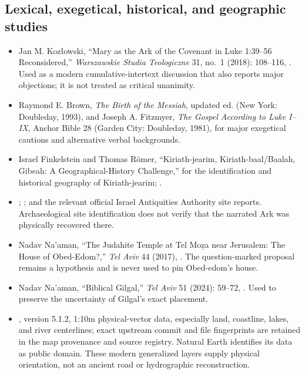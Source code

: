 \subsection{Lexical, exegetical, historical, and geographic studies}

\begin{itemize}
  \item Jan M. Kozłowski, ``Mary as the Ark of the Covenant in Luke 1:39--56 Reconsidered,'' \emph{Warszawskie Studia Teologiczne} 31, no.~1 (2018): 108--116, .  Used as a modern cumulative-intertext discussion that also reports major objections; it is not treated as critical unanimity.
  \item Raymond E. Brown, \emph{The Birth of the Messiah}, updated ed. (New York: Doubleday, 1993), and Joseph A. Fitzmyer, \emph{The Gospel According to Luke I--IX}, Anchor Bible 28 (Garden City: Doubleday, 1981), for major exegetical cautions and alternative verbal backgrounds.
  \item Israel Finkelstein and Thomas Römer, ``Kiriath-jearim, Kiriath-baal/Baalah, Gibeah: A Geographical-History Challenge,'' for the identification and historical geography of Kiriath-jearim; .
  \item {}; ; and the relevant official Israel Antiquities Authority site reports.  Archaeological site identification does not verify that the narrated Ark was physically recovered there.
  \item Nadav Na'aman, ``The Judahite Temple at Tel Mo\d{z}a near Jerusalem: The House of Obed-Edom?,'' \emph{Tel Aviv} 44 (2017), .  The question-marked proposal remains a hypothesis and is never used to pin Obed-edom's house.
  \item Nadav Na'aman, ``Biblical Gilgal,'' \emph{Tel Aviv} 51 (2024): 59--72, .  Used to preserve the uncertainty of Gilgal's exact placement.
  \item {}, version 5.1.2, 1:10m physical-vector data, especially land, coastline, lakes, and river centerlines; exact upstream commit and file fingerprints are retained in the map provenance and source registry.  Natural Earth identifies its data as public domain.  These modern generalized layers supply physical orientation, not an ancient road or hydrographic reconstruction.

\end{itemize}
